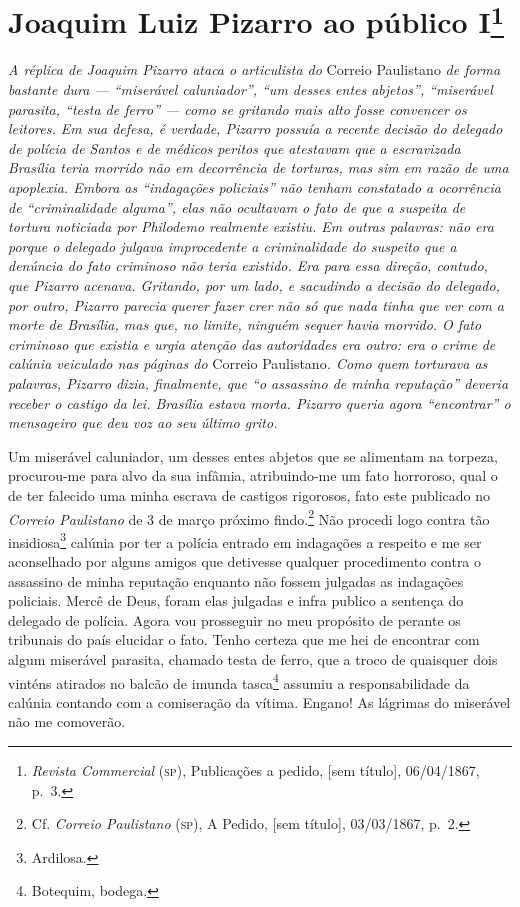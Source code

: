 \chapter{Joaquim Luiz Pizarro ao público I\footnote{\emph{Revista Commercial} (\textsc{sp}), Publicações a pedido, {[}sem título{]}, 06/04/1867, p.~3.}}

\begin{didascalia}
\emph{A réplica de Joaquim Pizarro ataca o articulista do} Correio
Paulistano \emph{de forma bastante dura --- ``miserável caluniador'', ``um
desses entes abjetos'', ``miserável parasita, ``testa de ferro'' --- como se
gritando mais alto fosse convencer os leitores. Em sua defesa, é
verdade, Pizarro possuía a recente decisão do delegado de polícia de
Santos e de médicos peritos que atestavam que a escravizada Brasília
teria morrido não em decorrência de torturas, mas sim em razão de uma
apoplexia. Embora as ``indagações policiais'' não tenham constatado a
ocorrência de ``criminalidade alguma'', elas não ocultavam o fato de que a
suspeita de tortura noticiada por Philodemo realmente existiu. Em outras
palavras: não era porque o delegado julgava improcedente a criminalidade
do suspeito que a denúncia do fato criminoso não teria existido. Era
para essa direção, contudo, que Pizarro acenava. Gritando, por um lado,
e sacudindo a decisão do delegado, por outro, Pizarro parecia querer
fazer crer não só que nada tinha que ver com a morte de Brasília, mas
que, no limite, ninguém sequer havia morrido. O fato criminoso que
existia e urgia atenção das autoridades era outro: era o crime de
calúnia veiculado nas páginas do} Correio Paulistano\emph{. Como quem
torturava as palavras, Pizarro dizia, finalmente, que ``o assassino de
minha reputação'' deveria receber o castigo da lei. Brasília estava
morta. Pizarro queria agora ``encontrar'' o mensageiro que deu voz ao seu
último grito.}
\end{didascalia}



Um miserável caluniador, um desses entes abjetos que se alimentam na
torpeza, procurou-me para alvo da sua infâmia, atribuindo-me um fato
horroroso, qual o de ter falecido uma minha escrava de castigos
rigorosos, fato este publicado no \emph{Correio Paulistano} de 3 de
março próximo findo.\footnote{ Cf. \emph{Correio Paulistano} (\textsc{sp}), A
  Pedido, {[}sem título{]}, 03/03/1867, p.~2.} Não procedi logo contra
tão insidiosa\footnote{ Ardilosa.} calúnia por ter
a polícia entrado em indagações a respeito e me ser aconselhado por
alguns amigos que detivesse qualquer procedimento contra o assassino de
minha reputação enquanto não fossem julgadas as indagações policiais.
Mercê de Deus, foram elas julgadas e infra publico a sentença do
delegado de polícia. Agora vou prosseguir no meu propósito de perante os
tribunais do país elucidar o fato. Tenho certeza que me hei de encontrar
com algum miserável parasita, chamado testa de ferro, que a troco de
quaisquer dois vinténs atirados no balcão de imunda
tasca\footnote{ Botequim, bodega.} assumiu a
responsabilidade da calúnia contando com a comiseração da vítima.
Engano! As lágrimas do miserável não me comoverão.

